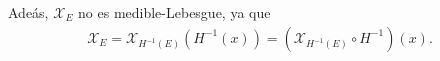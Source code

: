 \begin{ejemplo}
    Adeás, $\mathcal{X}_E$ no es medible-Lebesgue, ya que
    \begin{align*}
        \mathcal{X}_E = \mathcal{X}_{H^{-1}(E)}(H^{-1}(x)) = (\mathcal{X}_{H^{-1}(E)} \circ H^{-1})(x).
    \end{align*}
\end{ejemplo}
